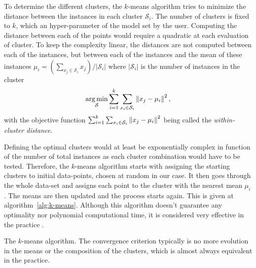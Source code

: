 To determine the different clusters, the $k$-means algorithm tries to minimize the distance between the instances in each cluster $\mathcal{S}_i$. The number of clusters is fixed to $k$, which an hyper-parameter of the model set by the user. Computing the distance between each of the points would require a quadratic at each evaluation of cluster. To keep the complexity linear, the distances are not computed between each of the instances, but between each of the instances and the mean of these instances $\mu_i = \left( \sum_{x_j \in \mathcal{S}_i} x_j\right)/\vert \mathcal{S}_i \vert$ where $\vert \mathcal{S}_i \vert$ is the number of instances in the cluster
\begin{equation}
    \underset{\mathcal{S}}{\mathrm{arg}\,\mathrm{min}} \sum_{i=1}^k \sum_{x_i \in \mathcal{S}_i} \left\lVert x_j-\mu_i\right\rVert^2,
\end{equation}
with the objective function $\sum_{i=1}^k \sum_{x_i \in \mathcal{S}_i} \left\lVert x_j-\mu_i\right\rVert^2$ being called the \emph{within-cluster distance}. 

Defining the optimal clusters would at least be exponentially complex in function of the number of total instances as each cluster combination would have to be tested. Therefore, the $k$-means algorithm starts with assigning the starting clusters to initial data-points, chosen at random in our case. It then goes through the whole data-set and assigns each point to the cluster with the nearest mean $\mu_i$. The means are then updated and the process starts again. This is given at algorithm~\ref{alg:k-means}. Although this algorithm doesn't guarantee any optimality nor polynomial computational time, it is considered very effective in the practice \cite{Arthur2006Worst-caseMethod}.

\begin{center}
\begin{algorithm}[H]
\DontPrintSemicolon

\caption[The $k$-means algorithm.]{The $k$-means algorithm. The convergence criterion typically is no more evolution in the means or the composition of the clusters, which is almost always equivalent in the practice.}
\label{alg:k-means}
\end{algorithm}
\end{center}

